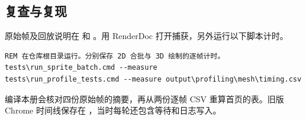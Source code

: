 \subsection{复查与复现}
原始帧及回放说明在  和 。用 RenderDoc 打开捕获，另外运行以下脚本计时。
\begin{lstlisting}
REM 在仓库根目录运行。分别保存 2D 合批与 3D 绘制的逐帧计时。
tests\run_sprite_batch.cmd --measure
tests\run_profile_tests.cmd --measure output\profiling\mesh\timing.csv
\end{lstlisting}
编译本册会核对四份原始帧的摘要，再从两份逐帧 CSV 重算首页的表。旧版 Chrome 时间线保存在 ，当时每轮还包含等待和日志写入。




































